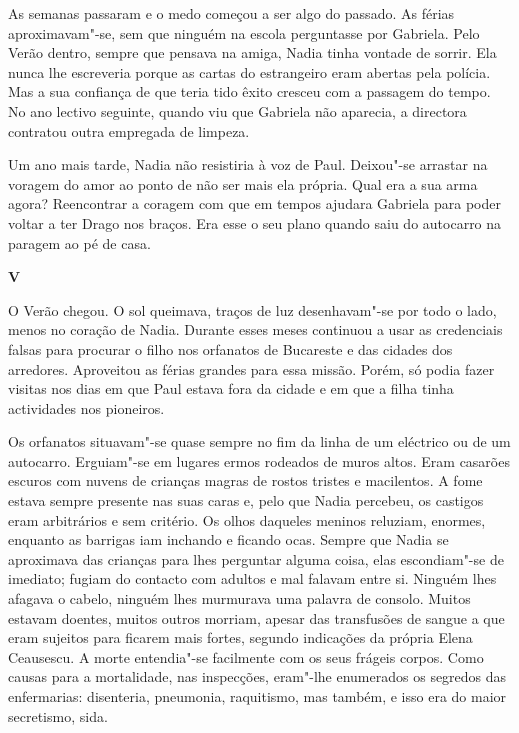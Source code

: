 As semanas passaram e o medo começou a ser algo do passado. As férias
aproximavam"-se, sem que ninguém na escola perguntasse por Gabriela. Pelo
Verão dentro, sempre que pensava na amiga, Nadia tinha vontade de
sorrir. Ela nunca lhe escreveria porque as cartas do estrangeiro eram
abertas pela polícia. Mas a sua confiança de que teria tido êxito
cresceu com a passagem do tempo. No ano lectivo seguinte, quando viu que
Gabriela não aparecia, a directora contratou outra empregada de limpeza.

Um ano mais tarde, Nadia não resistiria à voz de Paul. Deixou"-se
arrastar na voragem do amor ao ponto de não ser mais ela própria. Qual
era a sua arma agora? Reencontrar a coragem com que em tempos ajudara
Gabriela para poder voltar a ter Drago nos braços. Era esse o seu plano
quando saiu do autocarro na paragem ao pé de casa.


\pagebreak
\thispagestyle{empty}
\movetooddpage
\vspace*{1.8cm}
\noindent{}\textbf{V}

\bigskip

O Verão chegou. O sol queimava, traços de luz desenhavam"-se por todo o
lado, menos no coração de Nadia. Durante esses meses continuou a usar as
credenciais falsas para procurar o filho nos orfanatos de Bucareste e
das cidades dos arredores. Aproveitou as férias grandes para essa
missão. Porém, só podia fazer visitas nos dias em que Paul estava fora
da cidade e em que a filha tinha actividades nos pioneiros.

Os orfanatos situavam"-se quase sempre no fim da linha de um eléctrico ou
de um autocarro. Erguiam"-se em lugares ermos rodeados de muros altos.
Eram casarões escuros com nuvens de crianças magras de rostos tristes e
macilentos. A fome estava sempre presente nas suas caras e, pelo que
Nadia percebeu, os castigos eram arbitrários e sem critério. Os olhos
daqueles meninos reluziam, enormes, enquanto as barrigas iam inchando e
ficando ocas. Sempre que Nadia se aproximava das crianças para lhes
perguntar alguma coisa, elas escondiam"-se de imediato; fugiam do
contacto com adultos e mal falavam entre si. Ninguém lhes afagava o
cabelo, ninguém lhes murmurava uma palavra
de consolo. Muitos estavam doentes, muitos outros morriam, apesar das
transfusões de sangue a que eram sujeitos para ficarem mais fortes,
segundo indicações da própria Elena Ceausescu. A morte entendia"-se
facilmente com os seus frágeis corpos. Como causas para a mortalidade,
nas inspecções, eram"-lhe enumerados os segredos das enfermarias:
disenteria, pneumonia, raquitismo, mas também, e isso era do maior
secretismo, sida.

